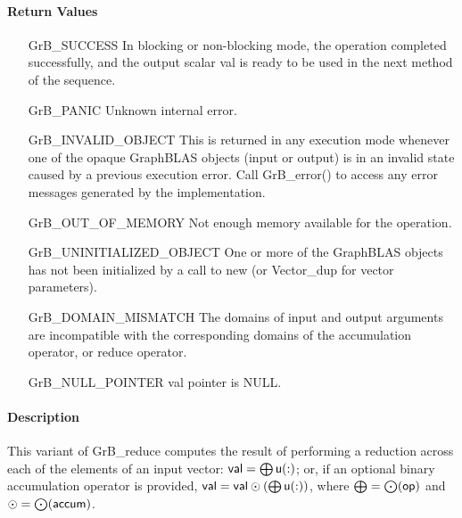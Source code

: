 \paragraph{Return Values}

\begin{itemize}[leftmargin=2.1in]
    \item[{\sf GrB\_SUCCESS}]         In blocking or non-blocking mode, 
    the operation completed successfully, and the
    output scalar {\sf val} is ready to be used in the next method of 
    the sequence.

    \item[{\sf GrB\_PANIC}]           Unknown internal error.

    \item[{\sf GrB\_INVALID\_OBJECT}] This is returned in any execution mode 
    whenever one of the opaque GraphBLAS objects (input or output) is in an invalid 
    state caused by a previous execution error.  Call {\sf GrB\_error()} to access 
    any error messages generated by the implementation.

    \item[{\sf GrB\_OUT\_OF\_MEMORY}] Not enough memory available for the operation.

    \item[{\sf GrB\_UNINITIALIZED\_OBJECT}] One or more of the GraphBLAS objects 
    has not been initialized by a call to {\sf new} (or {\sf Vector\_dup} for vector
    parameters).
    
    \item[{\sf GrB\_DOMAIN\_MISMATCH}]    The domains of input and output arguments are
    incompatible with the corresponding domains of the accumulation operator, 
    or reduce operator.

    \item[{\sf GrB\_NULL\_POINTER}]  {\sf val} pointer is {\sf NULL}.
\end{itemize}

\paragraph{Description}

This variant of {\sf GrB\_reduce} computes the result of performing
a reduction across each of the elements of an input vector:
${\sf val} = \bigoplus {\sf u}(:)$; or, if an optional binary accumulation 
operator is provided, ${\sf val} = {\sf val} \odot (\bigoplus {\sf u}(:))$, 
where $\bigoplus = \bigodot({\sf op})$ and $\odot = \bigodot({\sf accum})$.  

